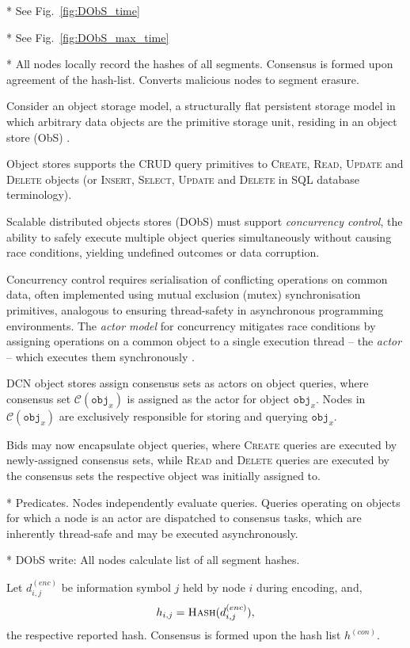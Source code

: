 * See Fig.~\ref{fig:DObS_time}

* See Fig.~\ref{fig:DObS_max_time}

* All nodes locally record the hashes of all segments. Consensus is formed upon agreement of the hash-list. Converts malicious nodes to segment erasure.

Consider an object storage model, a structurally flat persistent storage model in which arbitrary data objects are the primitive storage unit, residing in an object store (ObS) \cite{ObjectStore}.

Object stores supports the CRUD query primitives to \textsc{Create}, \textsc{Read}, \textsc{Update} and \textsc{Delete} objects (or \textsc{Insert}, \textsc{Select}, \textsc{Update} and \textsc{Delete} in SQL database terminology).

Scalable distributed objects stores (DObS) must support \emph{concurrency control}, the ability to safely execute multiple object queries simultaneously without causing race conditions, yielding undefined outcomes or data corruption.

Concurrency control requires serialisation of conflicting operations on common data, often implemented using mutual exclusion (mutex) synchronisation primitives, analogous to ensuring thread-safety in asynchronous programming environments. The \emph{actor model} for concurrency mitigates race conditions by assigning operations on a common object to a single execution thread -- the \emph{actor} -- which executes them synchronously \cite{ActorModel}.

DCN object stores assign consensus sets as actors on object queries, where consensus set $\mathcal{C}(\texttt{obj}_x)$ is assigned as the actor for object $\texttt{obj}_x$. Nodes in $\mathcal{C}(\texttt{obj}_x)$ are exclusively responsible for storing and querying $\texttt{obj}_x$.

Bids may now encapsulate object queries, where \textsc{Create} queries are executed by newly-assigned consensus sets, while \textsc{Read} and \textsc{Delete} queries are executed by the consensus sets the respective object was initially assigned to.

* Predicates. Nodes independently evaluate queries. Queries operating on objects for which a node is an actor are dispatched to consensus tasks, which are inherently thread-safe and may be executed asynchronously.

* DObS write: All nodes calculate list of all segment hashes.

Let $d^{(enc)}_{i,j}$ be information symbol $j$ held by node $i$ during encoding, and,
\begin{align}
	h_{i,j}=\textsc{Hash}(d_{i,j}^{(enc)}),
\end{align}
the respective reported hash. Consensus is formed upon the hash list $h^{(con)}$.

